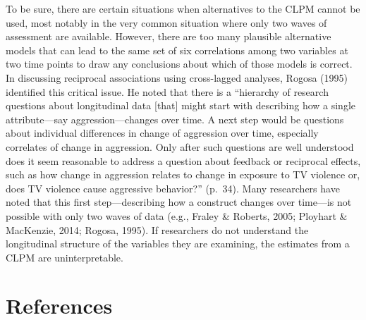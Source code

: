 \documentclass[
  english,
  man,floatsintext]{apa6}
\begin{document}
To be sure, there are certain situations when alternatives to the CLPM cannot be used, most notably in the very common situation where only two waves of assessment are available. However, there are too many plausible alternative models that can lead to the same set of six correlations among two variables at two time points to draw any conclusions about which of those models is correct. In discussing reciprocal associations using cross-lagged analyses, Rogosa (1995) identified this critical issue. He noted that there is a ``hierarchy of research questions about longitudinal data {[}that{]} might start with describing how a single attribute---say aggression---changes over time. A next step would be questions about individual differences in change of aggression over time, especially correlates of change in aggression. Only after such questions are well understood does it seem reasonable to address a question about feedback or reciprocal effects, such as how change in aggression relates to change in exposure to TV violence or, does TV violence cause aggressive behavior?'' (p.~34). Many researchers have noted that this first step---describing how a construct changes over time---is not possible with only two waves of data (e.g., Fraley \& Roberts, 2005; Ployhart \& MacKenzie, 2014; Rogosa, 1995). If researchers do not understand the longitudinal structure of the variables they are examining, the estimates from a CLPM are uninterpretable.

\hypertarget{references}{%
\section*{References}\label{references}}
\end{document}
